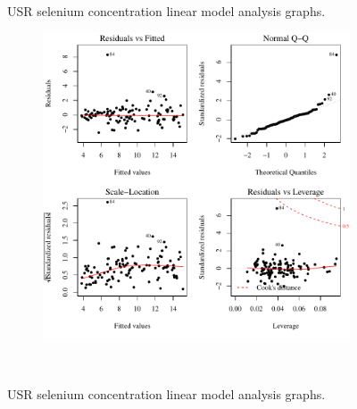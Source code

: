 \begin{linenumbers}
\begin{landscape}
\begin{figure}
\begin{subfigure}{0.7\textwidth}
		\end{subfigure}\\
		\caption{USR selenium concentration linear model analysis graphs.}
	\end{figure}
\end{landscape}

\subfiguremid
\begin{landscape}
	\begin{figure}
		\begin{subfigure}{0.7\textwidth}
			\centering
			\includegraphics[width=\tableCustomSize]{"Figures/Results_USR/Stochastic/Conc Model lm-fit UDIV"}
		\end{subfigure}\\
		\caption{USR selenium concentration linear model analysis graphs.}
	\end{figure}
\end{landscape}


\end{linenumbers}
